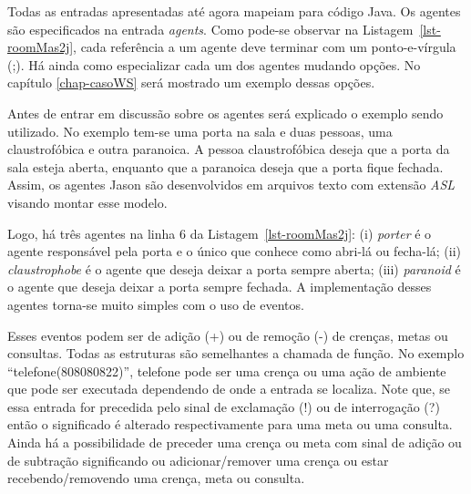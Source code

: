 Todas as entradas apresentadas até agora mapeiam para código Java.
Os agentes são especificados na entrada \emph{agents}. Como pode-se
observar na Listagem~\ref{lst-roomMas2j}, cada referência a um agente deve
terminar com um ponto-e-vírgula (;). Há ainda como especializar cada um dos
agentes mudando opções. No capítulo \ref{chap-casoWS} será mostrado um exemplo
dessas opções.

Antes de entrar em discussão sobre os agentes será explicado o exemplo sendo
utilizado. No exemplo tem-se uma porta na sala e duas pessoas, uma
claustrofóbica e outra paranoica. A pessoa claustrofóbica deseja que a
porta da sala esteja aberta, enquanto que a paranoica deseja que a porta
fique fechada. Assim, os agentes Jason são desenvolvidos em arquivos texto
com extensão \emph{ASL} visando montar esse modelo.

Logo, há três agentes na linha 6 da Listagem~\ref{lst-roomMas2j}:
(i) \emph{porter} é o agente responsável pela porta e o único que conhece
como abri-lá ou fecha-lá;
(ii) \emph{claustrophobe} é o agente que deseja deixar a porta sempre aberta;
(iii) \emph{paranoid} é o agente que deseja deixar a porta sempre fechada.
A implementação desses agentes torna-se muito simples com o uso de eventos.

Esses eventos podem ser de adição (+) ou de remoção (-) de crenças, metas ou
consultas. Todas as estruturas são semelhantes a chamada de função. No
exemplo ``telefone(808080822)'', telefone pode ser uma crença ou uma ação de
ambiente que pode ser executada dependendo de onde a entrada se localiza.
Note que, se essa entrada for precedida pelo sinal de exclamação (!) ou de
interrogação (?) então o significado é alterado respectivamente para uma meta
ou uma consulta. Ainda há a possibilidade de preceder uma crença ou meta
com sinal de adição ou de subtração significando ou adicionar/remover uma
crença ou estar recebendo/removendo uma crença, meta ou consulta.

